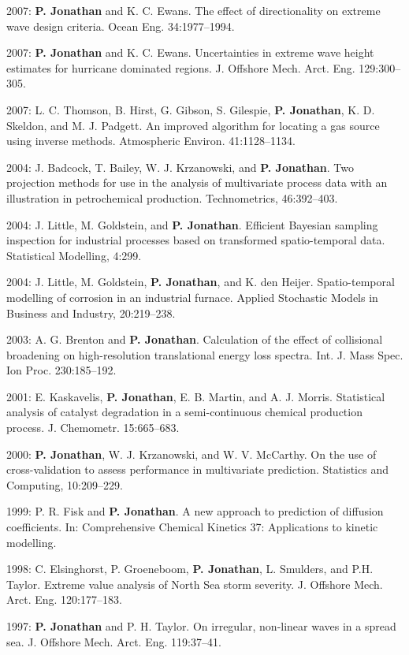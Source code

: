 \documentclass[11pt,a4paper]{moderncv}
\begin{document}
2007: \textbf{P. Jonathan} and K. C. Ewans. The effect of directionality on extreme wave design criteria. Ocean Eng. 34:1977--1994.

2007: \textbf{P. Jonathan} and K. C. Ewans. Uncertainties in extreme wave height estimates for hurricane dominated regions. J. Offshore Mech. Arct. Eng. 129:300--305.

2007: L. C. Thomson, B. Hirst, G. Gibson, S. Gilespie, \textbf{P. Jonathan}, K. D. Skeldon, and M. J. Padgett. An improved algorithm for locating a gas source using inverse methods. Atmospheric Environ. 41:1128--1134.

2004: J. Badcock, T. Bailey, W. J. Krzanowski, and \textbf{P. Jonathan}. Two projection methods for use in the analysis of multivariate process data with an illustration in petrochemical production. Technometrics, 46:392--403.

2004: J. Little, M. Goldstein, and \textbf{P. Jonathan}. Efficient Bayesian sampling inspection for industrial processes based on transformed spatio-temporal data. Statistical Modelling, 4:299.

2004: J. Little, M. Goldstein, \textbf{P. Jonathan}, and K. den Heijer. Spatio-temporal modelling of corrosion in an industrial furnace. Applied Stochastic Models in Business and Industry, 20:219--238.

2003: A. G. Brenton and \textbf{P. Jonathan}. Calculation of the effect of collisional broadening on high-resolution translational energy loss spectra. Int. J. Mass Spec. Ion Proc. 230:185--192.

2001: E. Kaskavelis, \textbf{P. Jonathan}, E. B. Martin, and A. J. Morris. Statistical analysis of catalyst degradation in a semi-continuous chemical production process. J. Chemometr. 15:665--683.

2000: \textbf{P. Jonathan}, W. J. Krzanowski, and W. V. McCarthy. On the use of cross-validation to assess performance in multivariate prediction. Statistics and Computing, 10:209--229.

1999: P. R. Fisk and \textbf{P. Jonathan}. A new approach to prediction of diffusion coefficients. In: Comprehensive Chemical Kinetics 37: Applications to kinetic modelling. 

1998: C. Elsinghorst, P. Groeneboom, \textbf{P. Jonathan}, L. Smulders, and P.H. Taylor. Extreme value analysis of North Sea storm severity. J. Offshore Mech. Arct. Eng. 120:177--183.

1997: \textbf{P. Jonathan} and P. H. Taylor. On irregular, non-linear waves in a spread sea. J. Offshore Mech. Arct. Eng. 119:37--41.
\end{document}
